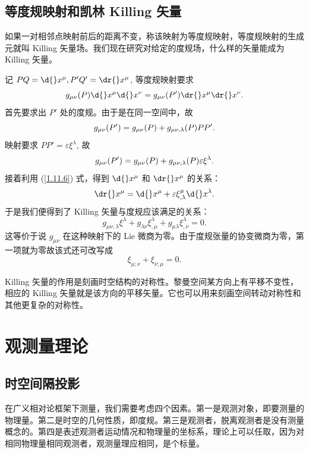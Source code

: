 \documentclass[UTF8, 12pt, a4paper, oneside, onecolumn, fontset=none]{ctexart}
\begin{document}
\subsection{等度规映射和凯林 Killing 矢量}
如果一对相邻点映射前后的距离不变，称该映射为等度规映射，等度规映射的生成元就叫 Killing 矢量场。我们现在研究对给定的度规场，什么样的矢量能成为 Killing 矢量。

记 $PQ=\d{}x^{\mu}, P'Q'=\dr{}x^{\mu}$, 等度规映射要求
\begin{equation}
g_{\mu\nu}\mleft(P\mright)\d{}x^{\mu}\d{}x^{\nu}=g_{\mu\nu}\mleft(P'\mright)\dr{}x^{\mu}\dr{}x^{\nu}.
\end{equation}
首先要求出 $P'$ 处的度规。由于是在同一空间中，故
\begin{equation}
g_{\mu\nu}\mleft(P'\mright)=g_{\mu\nu}\mleft(P\mright)+g_{\mu\nu,\lambda}\mleft(P\mright) PP'.
\end{equation}
映射要求 $PP'=\varepsilon\xi^{\lambda}$, 故
\begin{equation}
g_{\mu\nu}\mleft(P'\mright)=g_{\mu\nu}\mleft(P\mright)+g_{\mu\nu,\lambda}\mleft(P\mright)\varepsilon\xi^{\lambda}.
\end{equation}
接着利用 (\ref{1.11.6}) 式，得到 $\d{}x^{\mu}$ 和 $\dr{}x^{\mu}$ 的关系：
\begin{equation}
\dr{}x^{\mu}=\d{}x^{\mu}+\varepsilon\xi^{\mu}_{,\lambda}\d{}x^{\lambda}.
\end{equation}
于是我们便得到了 Killing 矢量与度规应该满足的关系：
\begin{equation}
g_{\mu\nu,\lambda}\xi^{\lambda}+g_{\lambda\nu}\xi^{\lambda}_{,\mu}+g_{\mu\lambda}\xi^{\lambda}_{,\nu}=0.
\end{equation}
这等价于说 $g_{\mu\nu}$ 在这种映射下的 Lie 微商为零。由于度规张量的协变微商为零，第一项就为零故该式还可改写成
\begin{equation}
\xi_{\mu;\nu}+\xi_{\nu;\mu}=0.\label{1.12.6}
\end{equation}

Killing 矢量的作用是刻画时空结构的对称性。黎曼空间某方向上有平移不变性，相应的 Killing 矢量就是该方向的平移矢量。它也可以用来刻画空间转动对称性和其他更复杂的对称性。

\newpage
\section{观测量理论}
\subsection{时空间隔投影}
在广义相对论框架下测量，我们需要考虑四个因素。第一是观测对象，即要测量的物理量。第二是时空的几何性质，即度规。第三是观测者，脱离观测者是没有测量概念的。第四是表述观测者运动情况和物理量的坐标系，理论上可以任取，因为对相同物理量相同观测者，观测量理应相同，是个标量。
\end{document}

